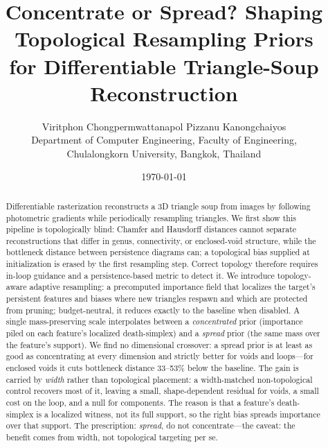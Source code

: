 \documentclass[11pt]{article}
\title{Concentrate or Spread? Shaping Topological Resampling Priors\\
       for Differentiable Triangle-Soup Reconstruction}
\author{Viritphon Chongpermwattanapol \qquad Pizzanu Kanongchaiyos\\[4pt]
  Department of Computer Engineering, Faculty of Engineering,\\
  Chulalongkorn University, Bangkok, Thailand}
\date{\today}
\begin{document}
\maketitle

\begin{abstract}
Differentiable rasterization reconstructs a 3D triangle soup from images by
following photometric gradients while periodically resampling triangles. We
first show this pipeline is topologically blind: Chamfer and Hausdorff
distances cannot separate reconstructions that differ in genus, connectivity,
or enclosed-void structure, while the bottleneck distance between persistence
diagrams can; a topological bias supplied at initialization is erased by the
first resampling step. Correct topology therefore requires in-loop guidance
and a persistence-based metric to detect it. We introduce topology-aware
adaptive resampling: a precomputed importance field that localizes the
target's persistent features and biases where new triangles respawn and which
are protected from pruning; budget-neutral, it reduces exactly to the baseline
when disabled. A single mass-preserving scale interpolates between a
\emph{concentrated} prior (importance piled on each feature's localized
death-simplex) and a \emph{spread} prior (the same mass over the feature's
support). We find no dimensional crossover: a spread prior is at least as good
as concentrating at every dimension and strictly better for voids and
loops---for enclosed voids it cuts bottleneck distance 33--53\% below the
baseline. The gain is carried by \emph{width} rather than topological
placement: a width-matched non-topological control recovers most of it,
leaving a small, shape-dependent residual for voids, a small cost on the loop,
and a null for components. The reason is that a feature's death-simplex is a
localized witness, not its full support, so the right bias spreads importance
over that support. The prescription: \emph{spread}, do not concentrate---the
caveat: the benefit comes from width, not topological targeting per se.
\end{abstract}











\end{document}
